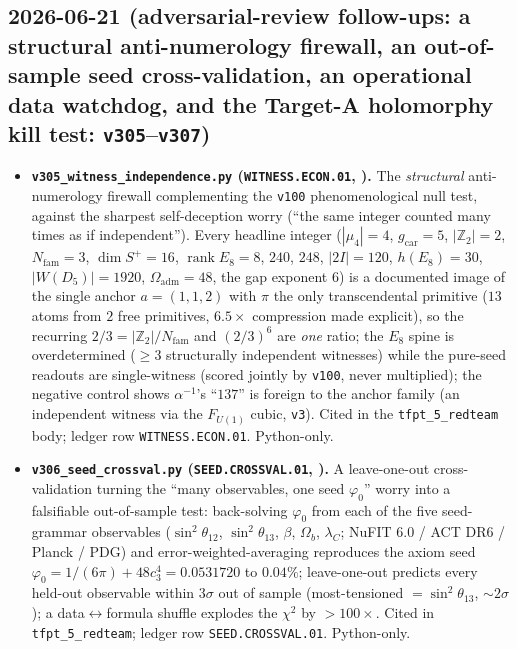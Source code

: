 \subsection*{2026-06-21 (adversarial-review follow-ups: a structural anti-numerology firewall, an out-of-sample seed cross-validation, an operational data watchdog, and the Target-A holomorphy kill test: \texttt{v305}--\texttt{v307})}
\begin{itemize}
\item \textbf{\texttt{v305\_witness\_independence.py} (\texttt{WITNESS.ECON.01}, \mE).} The \emph{structural} anti-numerology
  firewall complementing the \texttt{v100} phenomenological null test, against the sharpest self-deception worry
  (``the same integer counted many times as if independent''). Every headline integer ($|\mu_4|{=}4$,
  $g_{\mathrm{car}}{=}5$, $|\mathbb Z_2|{=}2$, $N_{\mathrm{fam}}{=}3$, $\dim S^+{=}16$, $\operatorname{rank}E_8{=}8$,
  $240$, $248$, $|2I|{=}120$, $h(E_8){=}30$, $|W(D_5)|{=}1920$, $\Omega_{\mathrm{adm}}{=}48$, the gap exponent $6$)
  is a documented image of the single anchor $a{=}(1,1,2)$ with $\pi$ the only transcendental primitive ($13$ atoms
  from $2$ free primitives, $6.5\times$ compression made explicit), so the recurring $2/3{=}|\mathbb Z_2|/N_{\mathrm{fam}}$
  and $(2/3)^6$ are \emph{one} ratio; the $E_8$ spine is overdetermined ($\ge3$ structurally independent witnesses)
  while the pure-seed readouts are single-witness (scored jointly by \texttt{v100}, never multiplied); the negative
  control shows $\alpha^{-1}$'s ``$137$'' is foreign to the anchor family (an independent witness via the $F_{U(1)}$
  cubic, \texttt{v3}). Cited in the \texttt{tfpt\_5\_redteam} body; ledger row \texttt{WITNESS.ECON.01}. Python-only.
\item \textbf{\texttt{v306\_seed\_crossval.py} (\texttt{SEED.CROSSVAL.01}, \mE).} A leave-one-out cross-validation
  turning the ``many observables, one seed $\varphi_0$'' worry into a falsifiable out-of-sample test: back-solving
  $\varphi_0$ from each of the five seed-grammar observables ($\sin^2\theta_{12}$, $\sin^2\theta_{13}$, $\beta$,
  $\Omega_b$, $\lambda_C$; NuFIT 6.0 / ACT DR6 / Planck / PDG) and error-weighted-averaging reproduces the axiom seed
  $\varphi_0=1/(6\pi)+48c_3^4=0.0531720$ to $0.04\%$; leave-one-out predicts every held-out observable within $3\sigma$
  out of sample (most-tensioned $=\sin^2\theta_{13}$, ${\sim}2\sigma$); a data$\leftrightarrow$formula shuffle explodes
  the $\chi^2$ by $>100\times$. Cited in \texttt{tfpt\_5\_redteam}; ledger row \texttt{SEED.CROSSVAL.01}. Python-only.

\end{itemize}

